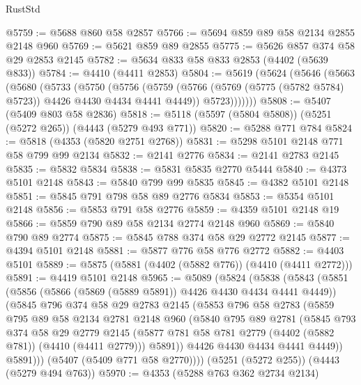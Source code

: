 \begin{lexlean}{RustStd}
\begin{coremodule}
@5759 := @5688 @860 @58 @2857
@5766 := @5694 @859 @89 @58 @2134 @2855 @2148 @960
@5769 := @5621 @859 @89 @2855
@5775 := @5626 @857 @374 @58 @29 @2853 @2145
@5782 := @5634 @833 @58 @833 @2853 (@4402 (@5639 @833))
@5784 := @4410 (@4411 @2853)
@5804 := @5619
    (@5624
      (@5646
        (@5663
          (@5680
            (@5733
              (@5750
                (@5756
                  (@5759 (@5766 (@5769 (@5775 (@5782 @5784) @5723)) @4426 @4430 @4434 @4441 @4449))
                  @5723)))))))
@5808 := @5407 (@5409 @803 @58 @2836)
@5818 := @5118 (@5597 (@5804 @5808)) (@5251 (@5272 @265)) (@4443 (@5279 @493 @771))
@5820 := @5288 @771 @784
@5824 := @5818 (@4353 (@5820 @2751 @2768))
@5831 := @5298 @5101 @2148 @771 @58 @799 @99 @2134
@5832 := @2141 @2776
@5834 := @2141 @2783 @2145
@5835 := @5832 @5834
@5838 := @5831 @5835 @2770 @5444
@5840 := @4373 @5101 @2148
@5843 := @5840 @799 @99 @5835
@5845 := @4382 @5101 @2148
@5851 := @5845 @791 @798 @58 @89 @2776 @5834
@5853 := @5354 @5101 @2148
@5856 := @5853 @791 @58 @2776
@5859 := @4359 @5101 @2148 @19
@5866 := @5859 @790 @89 @58 @2134 @2774 @2148 @960
@5869 := @5840 @790 @89 @2774
@5875 := @5845 @788 @374 @58 @29 @2772 @2145
@5877 := @4394 @5101 @2148
@5881 := @5877 @776 @58 @776 @2772
@5882 := @4403 @5101
@5889 := @5875 (@5881 (@4402 (@5882 @776)) (@4410 (@4411 @2772)))
@5891 := @4419 @5101 @2148
@5965 := @5089
    (@5824
      (@5838
        (@5843
          (@5851
            (@5856 (@5866 (@5869 (@5889 @5891)) @4426 @4430 @4434 @4441 @4449))
            (@5845
              @796
              @374
              @58
              @29
              @2783
              @2145
              (@5853
                @796
                @58
                @2783
                (@5859
                  @795
                  @89
                  @58
                  @2134
                  @2781
                  @2148
                  @960
                  (@5840
                    @795
                    @89
                    @2781
                    (@5845
                      @793
                      @374
                      @58
                      @29
                      @2779
                      @2145
                      (@5877 @781 @58 @781 @2779 (@4402 (@5882 @781)) (@4410 (@4411 @2779)))
                      @5891))
                  @4426
                  @4430
                  @4434
                  @4441
                  @4449))
              @5891)))
        (@5407 (@5409 @771 @58 @2770))))
    (@5251 (@5272 @255))
    (@4443 (@5279 @494 @763))
@5970 := @4353 (@5288 @763 @362 @2734 @2134)

\end{coremodule}
\end{lexlean}
